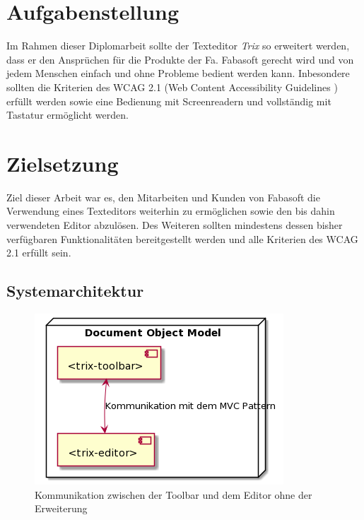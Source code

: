 \section{Aufgabenstellung}
Im Rahmen dieser Diplomarbeit sollte der Texteditor {\em{Trix}} so erweitert werden, dass er den Ansprüchen für die Produkte der Fa. Fabasoft gerecht wird und von jedem Menschen einfach und ohne Probleme bedient werden kann. Inbesondere sollten die Kriterien des WCAG 2.1 (Web Content Accessibility Guidelines \cite{wcag_2_1_2018}) erfüllt werden sowie eine Bedienung mit Screenreadern und vollständig mit Tastatur ermöglicht werden.

\section{Zielsetzung}
Ziel dieser Arbeit war es, den Mitarbeiten und Kunden von Fabasoft die Verwendung eines Texteditors weiterhin zu ermöglichen sowie den bis dahin verwendeten Editor abzulösen. Des Weiteren sollten mindestens dessen bisher verfügbaren Funktionalitäten bereitgestellt werden und alle Kriterien des WCAG 2.1 erfüllt sein.

\subsection{Systemarchitektur}
\begin{figure}[H]
\begin{center}
	\includegraphics[scale=.6]{images/trix_components.png}
\end{center}
	\caption{Kommunikation zwischen der Toolbar und dem Editor ohne der Erweiterung}
\end{figure}

